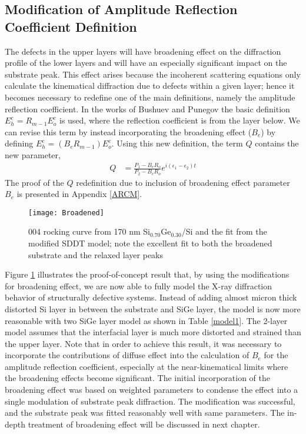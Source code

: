 		\subsection{Modification of Amplitude Reflection Coefficient Definition}

The defects in the upper layers will have broadening effect on the diffraction profile of the lower layers and will have an especially significant impact on the substrate peak.  This effect arises because the incoherent scattering equations only calculate the kinematical diffraction due to defects within a given layer; hence it becomes necessary to redefine one of the main definitions, namely the amplitude reflection coefficient.  In the works of Bushuev and Punegov the basic definition $E_h^c = R_{m-1} E_o^c$ is used, where the reflection coefficient is from the layer below.  We can revise this term by instead incorporating the broadening effect ($B_e$) by defining $E_h^c = (B_e R_{m-1}) E_o^c$.  Using this new definition, the term $Q$ contains the new parameter,
\begin{align}
Q &= \frac{P_1 - B_e R_o}{P_2- B_e R_o} e^{i (\epsilon_1 - \epsilon_2) t}
\end{align}
The proof of the $Q$ redefinition due to inclusion of broadening effect parameter $B_e$ is presented in Appendix \ref{ARCM}.
%
\begin{figure}
	\texttt{[image: Broadened]}
	\caption{004 rocking curve from 170 nm Si$_{0.70}$Ge$_{0.30}$/Si and the fit from the modified SDDT model; note the excellent fit to both the broadened substrate and the relaxed layer peaks}
	\label{fig:GeSi2}
	\end{figure}
%
Figure \ref{fig:GeSi2} illustrates the proof-of-concept result that, by using the modifications for broadening effect, we are now able to fully model the X-ray diffraction behavior of structurally defective systems.  Instead of adding almost micron thick distorted Si layer in between the substrate and SiGe layer, the model is now more reasonable with two SiGe layer model as shown in Table \ref{model1}.  The 2-layer model assumes that the interfacial layer is much more distorted and strained than the upper layer.   Note that in order to achieve this result, it was necessary to incorporate the contributions of diffuse effect into the calculation of $B_e$ for the amplitude reflection coefficient, especially at the near-kinematical limits where the broadening effects become significant. The initial incorporation of the broadening effect was based on weighted parameters to condense the effect into a single modulation of substrate peak diffraction.  The modification was successful, and the substrate peak was fitted reasonably well with same parameters.  The in-depth treatment of broadening effect will be discussed in next chapter.


